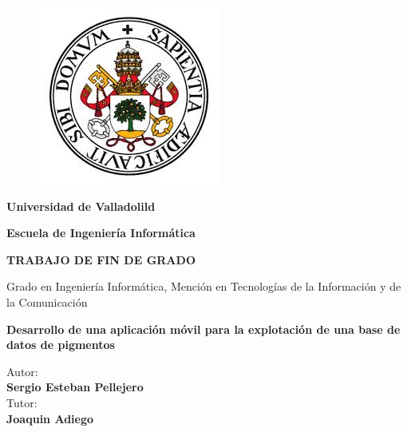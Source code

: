 \begin{titlepage}
\begin{center}
\thisfancypage{\setlength{\fboxsep}{20pt}\doublebox}{}
\begin{figure}[htb]
\begin{center}
\includegraphics[scale=0.5]{imagenes/logo.jpg}
\end{center}
\end{figure}

\begin{LARGE}
\textbf{Universidad de Valladolild}
\end{LARGE}

\vspace*{0.8in}
\begin{Huge}
\textbf{Escuela de Ingeniería Informática}
\end{Huge}

\vspace*{0.4in}
\begin{Large}
\textbf{TRABAJO DE FIN DE GRADO}
\end{Large}

\vspace*{0.8in}
\begin{LARGE}
Grado en Ingeniería Informática, Mención en Tecnologías de la Información y de la Comunicación
\end{LARGE}

\vspace{0.6in}
\begin{Huge}
\textbf{Desarrollo de una aplicación móvil para la explotación de una base de datos de pigmentos}
\end{Huge}

\vspace{0.4in}
\begin{flushright}
\begin{Large}
Autor:\\
\textbf{Sergio Esteban Pellejero}\\
Tutor:\\
\textbf{Joaquin Adiego}
\end{Large}
\end{flushright}

\end{center}
\end{titlepage}
